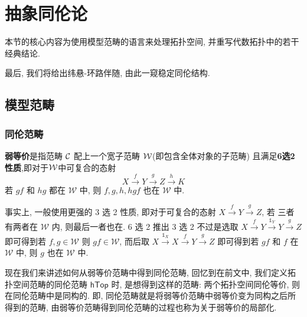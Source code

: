 \chapter{抽象同伦论}
\begin{introduction}
    \item 本节的核心内容为使用模型范畴的语言来处理拓扑空间, 并重写代数拓扑中的若干经典结论.
    \item 最后, 我们将给出纬悬-环路伴随, 由此一窥稳定同伦结构.
\end{introduction}
\section{模型范畴}
\subsection{同伦范畴}
\begin{definition}[弱等价范畴]
    \textbf{弱等价}是指范畴 $\cal{C}$ 配上一个宽子范畴 $\cal{W}$(即包含全体对象的子范畴) 
    且满足\textbf{6选2性质},即对于$\cal{W}$中可复合的态射 
    \[
    X\xrightarrow{f}Y \xrightarrow{g}Z \xrightarrow{h} K
    \] 
    若 $gf$ 和 $hg$ 都在 $\mathcal{W}$ 中, 则 $f,g,h,hgf$ 也在 $\mathcal{W}$ 中.
\end{definition}
\begin{remark}
    事实上, 一般使用更强的 3 选 2 性质, 即对于可复合的态射 $X \xrightarrow{f} Y \xrightarrow{g} Z$, 若
    三者有两者在 $\mathcal{W}$ 内, 则最后一者也在. 6 选 2 推出 3 选 2 不过是选取 
    $X \xrightarrow{f} Y \xrightarrow{\mathbb{1}_Y} Y \xrightarrow{g} Z$
    即可得到若 $f, g \in \mathcal{W}$ 则 $gf\in \mathcal{W}$, 而后取 
    $X\xrightarrow{\mathbb{1}_X} X \xrightarrow{f}Y \xrightarrow{g} Z$ 
    即可得到若 $gf$ 和 $f$ 在 $\mathcal{W}$ 中, 则 $g$ 也在 $\mathcal{W}$ 中.
\end{remark}
现在我们来讲述如何从弱等价范畴中得到同伦范畴, 回忆到在前文中, 
我们定义拓扑空间范畴的同伦范畴 $\mathsf{hTop}$ 时, 是想得到这样的范畴: 两个拓扑空间同伦等价, 则在同伦范畴中是同构的.
即, 同伦范畴就是将弱等价范畴中弱等价变为同构之后所得到的范畴, 由弱等价范畴得到同伦范畴的过程也称为关于弱等价的局部化.
